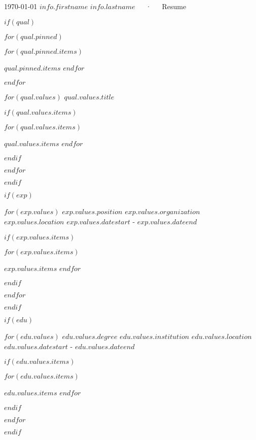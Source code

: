 \documentclass[18pt, letterpaper]{awesome-cv}
\begin{document}
\makecvheader[C]

\makecvfooter
  {\today}
  {$info.firstname$ $info.lastname$~~~·~~~Resume}
  {\thepage}

$if(qual)$
\begin{cventries}
$for(qual.pinned)$
\begin{cvitems}
$for(qual.pinned.items)$    
    \item{$qual.pinned.items$}
$endfor$
\end{cvitems}
\vspace{6mm}
$endfor$

$for(qual.values)$
\cventry
{}
{$qual.values.title$}
{}
{}
{
$if(qual.values.items)$
\begin{cvitems}
$for(qual.values.items)$
    \item{$qual.values.items$}
$endfor$
\end{cvitems}
$endif$
}
\vspace{6mm}
$endfor$
\end{cventries}
$endif$

$if(exp)$
\begin{cventries}

$for(exp.values)$
\cventry
{$exp.values.position$}
{$exp.values.organization$}
{$exp.values.location$}
{$exp.values.datestart$ - $exp.values.dateend$} 
{
$if(exp.values.items)$
\begin{cvitems}
$for(exp.values.items)$
    \item{$exp.values.items$}
$endfor$
\end{cvitems}
$endif$
}
\vspace{6mm}
$endfor$
\end{cventries}
$endif$

$if(edu)$
\begin{cventries}

$for(edu.values)$
\cventry
{$edu.values.degree$}
{$edu.values.institution$}
{$edu.values.location$}
{$edu.values.datestart$ - $edu.values.dateend$}
{
$if(edu.values.items)$
\begin{cvitems}
$for(edu.values.items)$
    \item{$edu.values.items$}
$endfor$
\end{cvitems}
$endif$
}
\vspace{6mm}
$endfor$
\end{cventries}
$endif$
\end{document}
